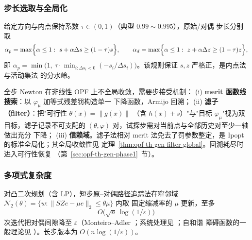 \subsubsection{步长选取与全局化}

\begin{definition}\label{def:opf-th-gen-ftb}
给定方向与内点保持系数 $\tau\in(0,1)$（典型 $0.99\sim0.995$），原始/对偶
步长分别取
\begin{equation}
\alpha_p=\max\Bigl\{\alpha\le1:\ s+\alpha\Delta s\ge(1-\tau)s\Bigr\},\qquad
\alpha_d=\max\Bigl\{\alpha\le1:\ z+\alpha\Delta z\ge(1-\tau)z\Bigr\},
\label{eq:opf-th-gen-ftb}
\end{equation}
即 $\alpha_p=\min\bigl(1,\ \tau\cdot\min_{i:\Delta s_i<0}
(-s_i/\Delta s_i)\bigr)$。该规则保证 $s,z$ 严格正，是内点法与活动集法
的分水岭。
\end{definition}

\begin{remark}[全局化的三条路线]\label{rem:opf-th-gen-globalization}
全步 Newton 在非线性 OPF 上不全局收敛，需要步接受机制：
(i) \textbf{merit 函数线搜索}：以 $\varphi_\mu$ 加等式残差罚构造单一
下降函数，Armijo 回溯；
(ii) \textbf{滤子（filter）}：把"可行性 $\theta(x)=\lVert g(x)\rVert$
（含 $h(x)+s$）"与"目标 $\varphi_\mu$"视为双目标，滤子记录不可支配的
$(\theta,\varphi)$ 对，试探步需对当前点与全部历史对至少一轴做出充分
下降\cite{opft:fletcher-leyffer,opft:waechter-biegler}；
(iii) \textbf{信赖域}。滤子法相对 merit 法免去了罚参数整定，是 Ipopt
的标准全局化；其全局收敛性见
定理~\ref{thm:opf-th-gen-filter-global}。回溯耗尽时进入可行性恢复
（第~\ref{sec:opf-th-gen-phase1}~节）。
\end{remark}

\subsubsection{多项式复杂度}

\begin{theorem}[凸情形的迭代复杂度]\label{thm:opf-th-gen-complexity}
对凸二次规划（含 LP），短步原--对偶路径追踪法在窄邻域
$\mathcal N_2(\theta)=\{w:\lVert SZe-\mu e\rVert_2\le\theta\mu\}$ 内取
固定缩减率的 $\mu$ 更新，至多
\begin{equation}
O\bigl(\sqrt{n}\,\log(1/\varepsilon)\bigr)
\end{equation}
次迭代把对偶间隙降至 $\varepsilon$（Monteiro--Adler
\cite{opft:monteiro-adler}；系统处理见 \cite{opft:wright-ipm}；自和谐
障碍函数的一般理论见 \cite{opft:nesterov-nemirovskii}）。长步版本为
$O(n\log(1/\varepsilon))$。
\end{theorem}

